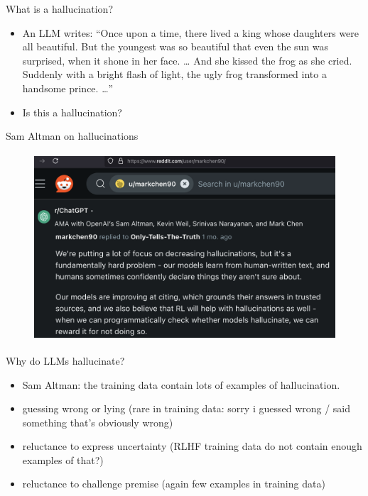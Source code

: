 \begin{vbframe}{What is a hallucination?}

\vfill


	\begin{itemize}


\item An LLM writes:
``Once upon a time, there
lived a king whose daughters
were all beautiful. But the
youngest was so beautiful
that even the sun was
surprised, when it shone in
her face. \ldots
 And she kissed the frog as she cried.
       Suddenly with a bright flash of light, the ugly frog
       transformed into a handsome prince.
       \ldots''
       
\item \ques Is this a hallucination?
\end{itemize}

\vfill

\end{vbframe}



\begin{vbframe}{Sam Altman on hallucinations}
\begin{figure}
\centering
\includegraphics[height = 7cm]{figure/altman,halluciation}
\end{figure}
\vfill
\end{vbframe}

\begin{vbframe}{Why do LLMs hallucinate?}

\vfill


	\begin{itemize}


\item Sam Altman: the training data contain lots of examples
of hallucination.
       
\item guessing wrong or lying (rare in training data: sorry
i guessed wrong / said something that's obviously wrong)

\item reluctance to express uncertainty (RLHF training data
do not contain enough examples of that?)

\item reluctance to challenge premise (again few examples in
training data)


\end{itemize}

\vfill

\end{vbframe}


